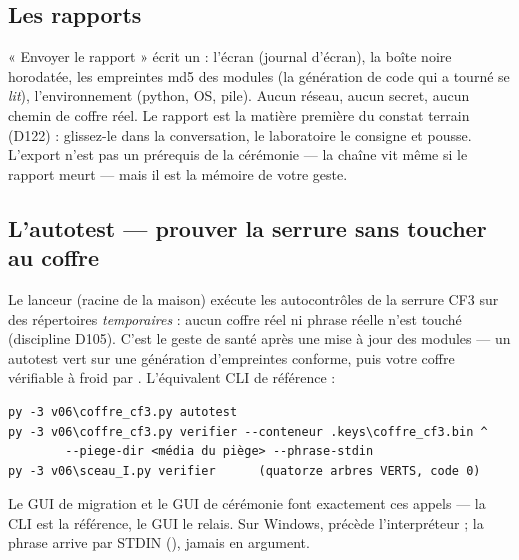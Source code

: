 \subsection{Les rapports}\label{sec:rapports}

« Envoyer le rapport » écrit un  : l'écran (journal d'écran), la boîte
noire horodatée, les empreintes md5 des modules (la génération de code qui a tourné se
\emph{lit}), l'environnement (python, OS, pile). Aucun réseau, aucun secret, aucun
chemin de coffre réel. Le rapport est la matière première du constat terrain (D122) :
glissez-le dans la conversation, le laboratoire le consigne et pousse. L'export n'est
pas un prérequis de la cérémonie — la chaîne vit même si le rapport meurt — mais il
est la mémoire de votre geste.

\subsection{L'autotest — prouver la serrure sans toucher au coffre}\label{sec:autotest}

Le lanceur  (racine de la maison) exécute les
autocontrôles de la serrure CF3 sur des répertoires \emph{temporaires} : aucun coffre
réel ni phrase réelle n'est touché (discipline D105). C'est le geste de santé après
une mise à jour des modules — un autotest vert sur une génération d'empreintes
conforme, puis votre coffre vérifiable à froid par . L'équivalent CLI
de référence :

\begin{lstlisting}
py -3 v06\coffre_cf3.py autotest
py -3 v06\coffre_cf3.py verifier --conteneur .keys\coffre_cf3.bin ^
        --piege-dir <média du piège> --phrase-stdin
py -3 v06\sceau_I.py verifier      (quatorze arbres VERTS, code 0)
\end{lstlisting}

Le GUI de migration et le GUI de cérémonie font exactement ces appels — la CLI est la
référence, le GUI le relais. Sur Windows,  précède l'interpréteur ; la
phrase arrive par STDIN (), jamais en argument.
